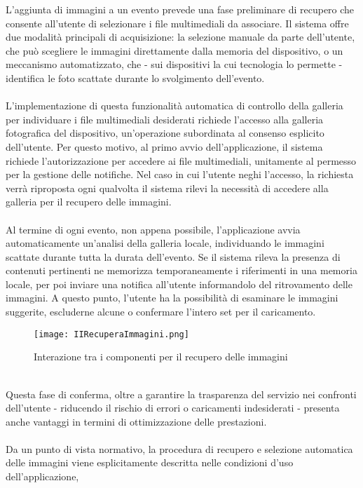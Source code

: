 L'aggiunta di immagini a un evento prevede una fase preliminare di recupero
che consente all'utente di selezionare i file multimediali da associare. 
Il sistema offre due modalità principali di acquisizione:
la selezione manuale da parte dell'utente, 
che può scegliere le immagini direttamente dalla memoria del dispositivo, 
o un meccanismo automatizzato,
che - sui dispositivi la cui tecnologia lo permette - 
identifica le foto scattate durante lo svolgimento dell'evento.\\
\\
L'implementazione di questa funzionalità automatica di controllo della galleria 
per individuare i file multimediali desiderati
richiede l'accesso alla galleria fotografica del dispositivo, 
un'operazione subordinata al consenso esplicito dell'utente. 
Per questo motivo, al primo avvio dell'applicazione, 
il sistema richiede l'autorizzazione per accedere ai file multimediali, 
unitamente al permesso per la gestione delle notifiche. 
Nel caso in cui l'utente neghi l'accesso,
la richiesta verrà riproposta ogni qualvolta il sistema rilevi la necessità 
di accedere alla galleria per il recupero delle immagini.\\
\\
Al termine di ogni evento, non appena possibile, 
l'applicazione avvia automaticamente un'analisi della galleria locale, 
individuando le immagini scattate durante tutta la durata dell'evento. 
Se il sistema rileva la presenza di contenuti pertinenti
ne memorizza temporaneamente i riferimenti in una memoria locale,
per poi inviare una notifica all'utente
informandolo del ritrovamento delle immagini. 
A questo punto, l'utente ha la possibilità di esaminare le immagini suggerite, 
escluderne alcune o confermare l'intero set per il caricamento.\\
\begin{figure}[htb]
    \centering
    \texttt{[image: IIRecuperaImmagini.png]}
    \caption{Interazione tra i componenti per il recupero delle immagini}
\end{figure}
\\
Questa fase di conferma,
oltre a garantire la trasparenza del servizio nei confronti dell'utente 
- riducendo il rischio di errori o caricamenti indesiderati -
presenta anche vantaggi in termini di ottimizzazione delle prestazioni. \\
\\
Da un punto di vista normativo, 
la procedura di recupero e selezione automatica delle immagini
viene esplicitamente descritta nelle condizioni d'uso dell'applicazione, 
